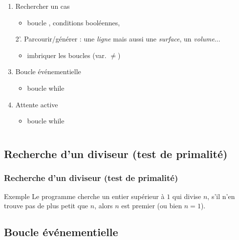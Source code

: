 \documentclass[xcolor=pdftex,svgnames,table]{beamer}
\begin{document}
\begin{frame}
\begin{columns}
\begin{column}[t]{0.59\linewidth}
\begin{enumerate}
\begin{itemize}
      \end{itemize}\pause
    \item Rechercher un cas\pause
      \begin{itemize}
        \item boucle \alert{}, conditions booléennes, 
      \end{itemize}\pause
    \item[2'.] Parcourir/générer : une \emph{ligne} mais aussi une \emph{surface}, un \emph{volume}...\pause
      \begin{itemize}
        \item imbriquer les boucles (var. $\neq$)
      \end{itemize}\pause
    \item Boucle événementielle
  \begin{itemize}
\item boucle \alert{while}
  \end{itemize}\pause
    \item Attente active 
  \begin{itemize}
\item boucle \alert{while}
  \end{itemize}
\end{enumerate}
\end{column}
\end{columns}
\end{frame}


\subsection{Recherche d'un diviseur (test de primalité)}

\begin{frame}[fragile]
\frametitle{Recherche d'un diviseur (test de primalité)}

\begin{block}{Exemple}
  Le programme cherche un entier supérieur à $1$ qui divise $n$, s'il n'en trouve pas
 de plus petit que $n$, alors $n$ est premier (ou bien $n = 1$).\nowrite
\end{block}

\end{frame}


\subsection{Boucle événementielle}
\end{document}

